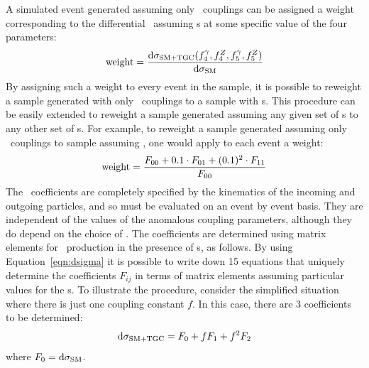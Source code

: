 A simulated event generated assuming only \sm\ couplings can be assigned a weight corresponding to the differential \cx\
assuming \TGC s at some specific value of the four parameters:
\begin{equation}
{\rm weight} = \frac{{\rm d}\sigma_{\rm SM+TGC}(f_{4}^{\gamma}, f_{4}^{Z}, f_{5}^{\gamma},
f_{5}^{Z})}{{\rm d}\sigma_{\rm SM}}
\end{equation}
By assigning such a weight to every event in the sample, it is possible to reweight a sample
generated with only \sm\ couplings to a sample with \TGC s.
This procedure can be easily extended to reweight a sample generated assuming
any given set of \TGC s to any other set of \TGC s. For example, to reweight a sample
generated assuming only \sm\ couplings to sample assuming \ffourg=0.1, one would
apply to each event a weight:
\begin{eqnarray}\label{revisit}
{\rm weight} = \frac{F_{00} + 0.1 \cdot  F_{01} + (0.1)^{2} \cdot
F_{11}}{F_{00}}
\end{eqnarray}
The \Fij\ coefficients are completely
specified by the kinematics of the incoming and outgoing particles, and so must
be evaluated on an event by event basis. They are
independent of the values of the anomalous coupling parameters, although they do depend on
the choice of \formfactor. The coefficients are determined using matrix elements for
\ZZllll\ production in the presence of \TGC s, as follows. By using Equation~\ref{eqn:dsigma} it 
is possible to write down 15 equations that uniquely determine the 
coefficients $F_{ij}$ in terms of matrix elements assuming particular values
for the \TGC s.
To illustrate the procedure, consider the simplified situation where 
there is just one coupling constant $f$. In this case, there are 3 coefficients 
to be determined:
\begin{eqnarray}\label{revisit2}
{\rm d}\sigma_{\rm SM+TGC} = F_0 + fF_1 + f^2F_2 
\end{eqnarray}
where  $F_0={\rm d}\sigma_{\rm SM}$.

